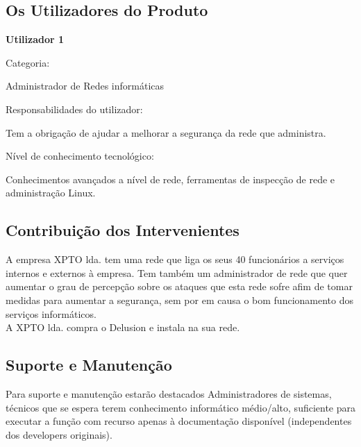 \subsection{Os Utilizadores do Produto}
\begin{description}
\item \textbf{Utilizador 1}
\item Categoria: 

Administrador de Redes informáticas
\item Responsabilidades do utilizador: 

Tem a obrigação de ajudar a melhorar a segurança da rede que administra.
\item Nível de conhecimento tecnológico: 

Conhecimentos avançados a nível de rede, ferramentas de inspecção de rede e administração Linux.
\end{description}


\subsection{Contribuição dos Intervenientes}
A empresa XPTO lda. tem uma rede que liga os seus 40 funcionários a serviços internos e externos à empresa. Tem também um administrador de rede que
quer aumentar o grau de percepção sobre os ataques que esta rede sofre afim de tomar medidas para aumentar a segurança, sem por em
causa o bom funcionamento dos serviços informáticos.\\
A XPTO lda. compra o Delusion e instala na sua rede.

\subsection{Suporte e Manutenção}
Para suporte e manutenção estarão destacados Administradores de sistemas, técnicos que se espera terem conhecimento informático médio/alto,
suficiente para executar a função com recurso apenas à documentação disponível (independentes dos developers originais).

